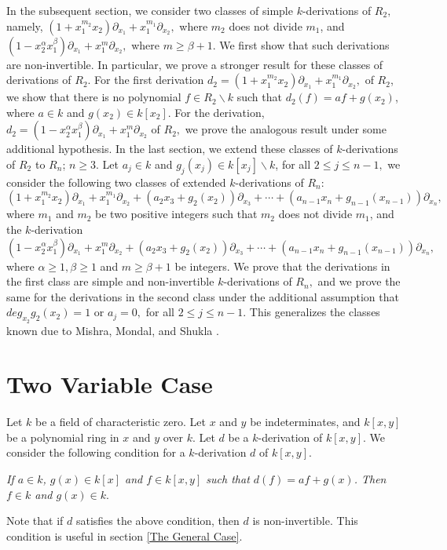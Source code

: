 \documentclass[12pt,reqno]{amsart}
\renewcommand{\setminus}{\smallsetminus}
\renewcommand{\leq}{\leqslant}
\renewcommand{\geq}{\geqslant}
\numberwithin{thm}{section}
\theoremstyle{definition}
\numberwithin{equation}{thm}
\theoremstyle{plain}
\begin{document}
In the subsequent section, we consider two classes of simple $k$-derivations of $R_2,$ namely, $(1+x_1^{m_2}x_2)\partial_{x_1}+x_1^{m_1}\partial_{x_2},$ where $m_2$ does not divide $m_1$, and $(1-x_2^{\alpha}x_1^{\beta})\partial_{x_1}+x_1^{m}\partial_{x_2},$ where $m\geq \beta+1.$ We first show that such derivations are non-invertible. In particular, we prove a stronger result for these classes of derivations of  $R_2$. For the first derivation $d_2=(1+x_1^{m_2}x_2)\partial_{x_1}+x_1^{m_1}\partial_{x_2},$ of $R_2$, we show that there is no polynomial $f\in R_2\setminus k$ such that $d_2(f)=af+g(x_2)$, where $a\in k$ and $g(x_2)\in k[x_2].$ For the derivation, $d_2=(1-x_2^{\alpha}x_1^{\beta})\partial_{x_1}+x_1^{m}\partial_{x_2}$ of $R_2,$ we prove the analogous result under some additional hypothesis. In the last section, we extend these classes of $k$-derivations of $R_2$ to $ R_n$; $ n\geq 3$. Let $a_j\in k$ and $g_j(x_j)\in k[x_j]\setminus k$, for all $2\leq j\leq n-1,$ we consider the  following two classes of extended $k$-derivations of $R_n$: $$(1 +x_1^{m_2}x_2)\partial_{x_1}+x_1^{m_1}\partial_{x_2}+(a_2 x_3 +g_2(x_2))\partial_{x_3}+\cdots+(a_{n-1}x_n + g_{n-1}(x_{n-1}))\partial_{x_n},$$ where $m_1$ and $m_2$ be two positive integers such that $m_2$ does not divide $m_1$, and the $k$-derivation $$(1-x_2^{\alpha} x_1^{\beta})\partial_{x_1} +x_1^m\partial_{x_2}+(a_2 x_3 +g_2(x_2))\partial_{x_3}+\cdots+(a_{n-1}x_n + g_{n-1}(x_{n-1}))\partial_{x_n},$$ where $\alpha\geq 1,\beta\geq 1$ and $m\geq \beta+1$ be integers. We prove that the derivations in the first class are simple and non-invertible $k$-derivations of $R_n,$ and we prove the same for the derivations in the second class under the additional assumption that $deg_{x_2}g_2(x_2)=1$ or $a_j=0,$ for all $2\leq j\leq n-1.$ This generalizes the classes known due to Mishra, Mondal, and Shukla \cite{MMS26,MMS25'}. 

\section{Two Variable Case}
Let $k$ be a field of characteristic zero. Let $x$ and $y$ be indeterminates, and $k[x,y]$ be a polynomial ring in $x$ and $y$ over $k$. Let $d$ be a $k$-derivation of $k[x,y].$ We consider the following condition for a $k$-derivation $d$ of $k[x,y].$ 

\emph{If $a\in k$, $g(x)\in k[x]$ and $f\in k[x,y]$ such that $d(f)=af+g(x)$. Then $f\in k$ and $g(x)\in k.$} 

Note that if $d$ satisfies the above condition, then $d$ is non-invertible. This condition is useful in section \ref{The General Case}.\\
\end{document}
